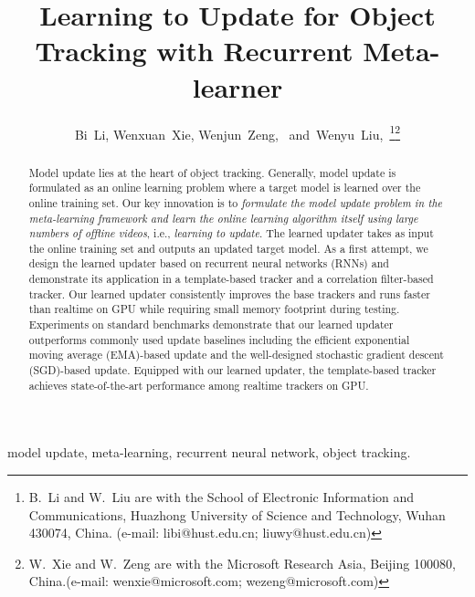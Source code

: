\documentclass[journal]{IEEEtran}
\begin{document}
\title{Learning to Update for Object Tracking with Recurrent Meta-learner}

\author{Bi~Li,
		Wenxuan~Xie,
		Wenjun~Zeng,~
        and~Wenyu~Liu,~\thanks{B.~Li and W.~Liu are with the School of Electronic Information and
Communications, Huazhong University of Science and Technology,
Wuhan 430074, China. (e-mail: libi@hust.edu.cn; liuwy@hust.edu.cn)}\thanks{W.~Xie and W.~Zeng are with the Microsoft Research Asia, Beijing 100080,
China.(e-mail: wenxie@microsoft.com; wezeng@microsoft.com)}}

\maketitle

\begin{abstract}
  Model update lies at the heart of object tracking.
  Generally, model update is formulated as an online learning problem where a target model is learned over the online training set. Our key innovation is to \emph{formulate the model update problem in the meta-learning framework and learn the online learning algorithm itself using large numbers of offline videos}, i.e., \emph{learning to update}.
 The learned updater takes as input the online training set and outputs an updated target model. 
  As a first attempt, we design the learned updater based on recurrent neural networks (RNNs) and demonstrate its application in a template-based tracker and a correlation filter-based tracker. Our learned updater consistently improves the base trackers and runs faster than realtime on GPU while requiring small memory footprint during testing.
  Experiments on standard benchmarks demonstrate that our learned updater outperforms commonly used update baselines including the efficient exponential moving average (EMA)-based update and the well-designed stochastic gradient descent (SGD)-based update. Equipped with our learned updater, the template-based tracker achieves state-of-the-art performance among realtime trackers on GPU.
\end{abstract}

\begin{IEEEkeywords}
model update, meta-learning, recurrent neural network, object tracking.
\end{IEEEkeywords}

\IEEEpeerreviewmaketitle
\end{document}
